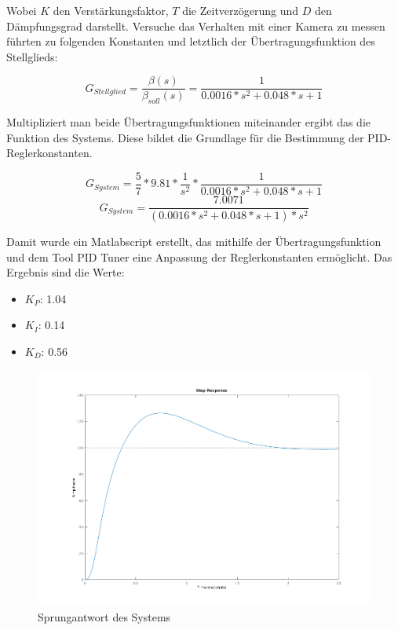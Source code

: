 \documentclass[12pt,a4paper,bibliography=totoc,listof=totoc]{scrartcl}
\begin{document}
Wobei \(K\) den Verstärkungsfaktor, \(T\) die Zeitverzögerung und \(D\) den Dämpfungsgrad darstellt. Versuche das Verhalten mit einer Kamera zu messen führten zu folgenden Konstanten und letztlich der Übertragungsfunktion des Stellglieds:

\begin{equation} 
G_{Stellglied} =  \dfrac{\beta(s)}{\beta_{soll}(s)} = 
\dfrac{1}{0.0016*s^2+0.048*s+1}
\end{equation}

Multipliziert man beide Übertragungsfunktionen miteinander ergibt das die Funktion des Systems. Diese bildet die Grundlage für die Bestimmung der PID-Reglerkonstanten. 

\begin{equation} 
G_{System} = \dfrac{5}{7} * 9.81 * \dfrac{1}{s^2} * \dfrac{1}{0.0016*s^2+0.048*s+1}
\end{equation}
\begin{equation} 
G_{System} = \dfrac{7.0071}{{(0.0016*s^2+0.048*s+1)*s^2}}
\end{equation}

Damit wurde ein Matlabscript erstellt, das mithilfe der Übertragungsfunktion und dem Tool PID Tuner eine Anpassung der Reglerkonstanten ermöglicht. Das Ergebnis sind die Werte:

\begin{itemize}
\item \(K_P\): 1.04
\item \(K_I\): 0.14
\item \(K_D\): 0.56
\end{itemize} 

\begin{figure}[htbp]
	\centering
	\includegraphics[scale = 0.35]{pics/Sprung}
	\caption{Sprungantwort des Systems}
	\label{Sprung}
\end{figure}
\end{document}
